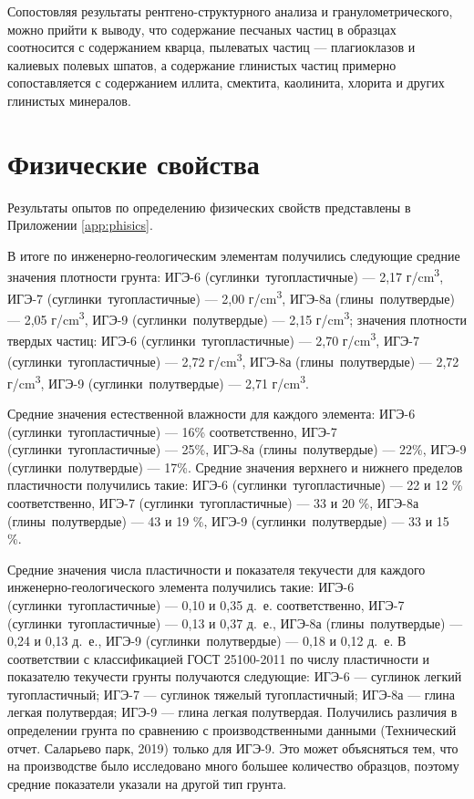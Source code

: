 Сопостовляя результаты рентгено-структурного анализа и гранулометрического, 
можно прийти к выводу, что содержание песчаных частиц в образцах соотносится с 
содержанием кварца, пылеватых частиц — плагиоклазов и калиевых
полевых шпатов, а содержание глинистых частиц примерно сопоставляется с 
содержанием иллита, смектита, каолинита, хлорита и других глинистых минералов.

\section{Физические свойства}

Результаты опытов по определению физических свойств представлены в 
Приложении \ref{app:phisics}. 

В итоге по инженерно-геологическим элементам получились следующие 
средние значения плотности грунта: 
ИГЭ-6 (суглинки тугопластичные) --- 2,17 г/\si{\centi\meter^3}, 
ИГЭ-7 (суглинки тугопластичные) --- 2,00 г/\si{\centi\meter^3}, 
ИГЭ-8а (глины полутвердые) --- 2,05 г/\si{\centi\meter^3}, 
ИГЭ-9 (суглинки полутвердые) --- 2,15 г/\si{\centi\meter^3}; 
значения плотности твердых частиц: 
ИГЭ-6 (суглинки тугопластичные) --- 2,70 г/\si{\centi\meter^3}, 
ИГЭ-7 (суглинки тугопластичные) --- 2,72 г/\si{\centi\meter^3}, 
ИГЭ-8а (глины полутвердые) --- 2,72 г/\si{\centi\meter^3}, 
ИГЭ-9 (суглинки полутвердые) --- 2,71 г/\si{\centi\meter^3}. 

Средние значения естественной влажности для каждого элемента:
ИГЭ-6 (суглинки тугопластичные) --- 16\% соответственно, 
ИГЭ-7 (суглинки тугопластичные) --- 25\%, 
ИГЭ-8а (глины полутвердые) --- 22\%, 
ИГЭ-9 (суглинки полутвердые) --- 17\%.
Средние значения верхнего и нижнего пределов пластичности 
получились такие: 
ИГЭ-6 (суглинки тугопластичные) --- 22 и 12 \% соответственно, 
ИГЭ-7 (суглинки тугопластичные) --- 33 и 20 \%, 
ИГЭ-8а (глины полутвердые) --- 43 и 19 \%, 
ИГЭ-9 (суглинки полутвердые) --- 33 и 15 \%.

Средние значения числа пластичности и показателя текучести 
для каждого инженерно-геологического элемента получились такие:
ИГЭ-6 (суглинки тугопластичные) --- 0,10 и 0,35 д.~е. соответственно, 
ИГЭ-7 (суглинки тугопластичные) --- 0,13 и 0,37 д.~е., 
ИГЭ-8а (глины полутвердые) --- 0,24 и 0,13 д.~е., 
ИГЭ-9 (суглинки полутвердые) --- 0,18 и 0,12 д.~е.
В соответствии с классификацией ГОСТ 25100-2011 
по числу пластичности и показателю текучести 
грунты получаются следующие:
ИГЭ-6 --- суглинок легкий тугопластичный;
ИГЭ-7 --- суглинок тяжелый тугопластичный;
ИГЭ-8а --- глина легкая полутвердая;
ИГЭ-9 --- глина легкая полутвердая.
Получились различия в определении грунта по сравнению 
с производственными данными (Технический отчет. Саларьево парк, 2019) только для 
ИГЭ-9. Это может объясняться тем, что на производстве 
было исследовано много большее количество образцов, 
поэтому средние показатели указали на другой 
тип грунта.

